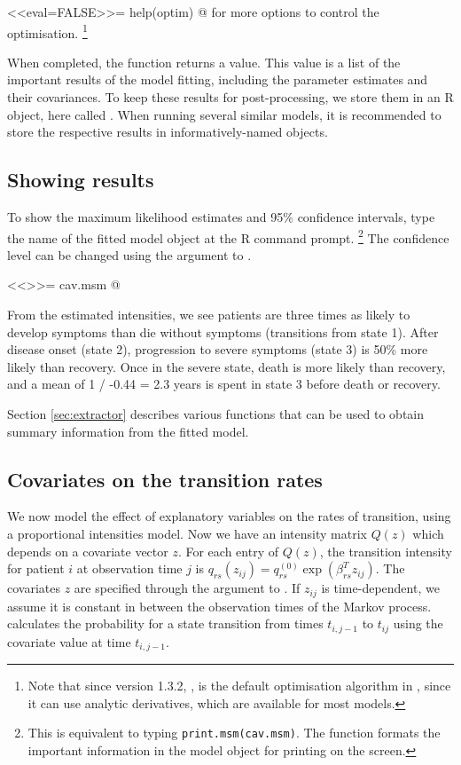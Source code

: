 <<eval=FALSE>>=
help(optim)
@
for more options to control the optimisation. \footnote{Note that since version 1.3.2, , is the default optimisation algorithm in , since it can use analytic derivatives, which are available for most models.}

When completed, the  function returns a value.  This
value is a list of the important results of the model fitting,
including the parameter estimates and their covariances.  To keep
these results for post-processing, we store them in an R object, here
called .  When running several similar
 models, it is recommended to store the respective
results in informatively-named objects.


\subsection{Showing results}

To show the maximum likelihood estimates and 95\% confidence
intervals, type the name of the fitted model object at the R command
prompt.  \footnote{This is equivalent to typing
  \texttt{print.msm(cav.msm)}.  The function 
  formats the important information in the model object for printing
  on the screen.}  The confidence level can be changed using the
 argument to .

<<>>=
cav.msm
@

From the estimated intensities, we see patients are three times
as likely to develop symptoms than die without symptoms (transitions from state 1).
After disease onset (state 2), progression to severe symptoms (state
3) is 50\% more likely than recovery.  Once in the severe state, death
is more likely than recovery, and a mean of 1 / -0.44 = 2.3 years is
spent in state 3 before death or recovery.

Section \ref{sec:extractor} describes various functions that can be
used to obtain summary information from the fitted model.


\subsection{Covariates on the transition rates}
\label{sec:msm:covariates}

We now model the effect of explanatory variables on the rates of
transition, using a proportional intensities model. Now we have an
intensity matrix $Q(z)$ which depends on a covariate vector $z$. For
each entry of $Q(z)$, the transition intensity for patient $i$ at
observation time $j$ is $q_{rs}(z_{ij}) = q_{rs}^{(0)}
\exp(\beta_{rs}^T z_{ij})$.  The covariates $z$ are specified through
the  argument to . If $z_{ij}$ is
time-dependent, we assume it is constant in between the observation
times of the Markov process.   calculates the
probability for a state transition from times $t_{i,j-1}$ to $t_{ij}$
using the covariate value at time $t_{i,j-1}$.

